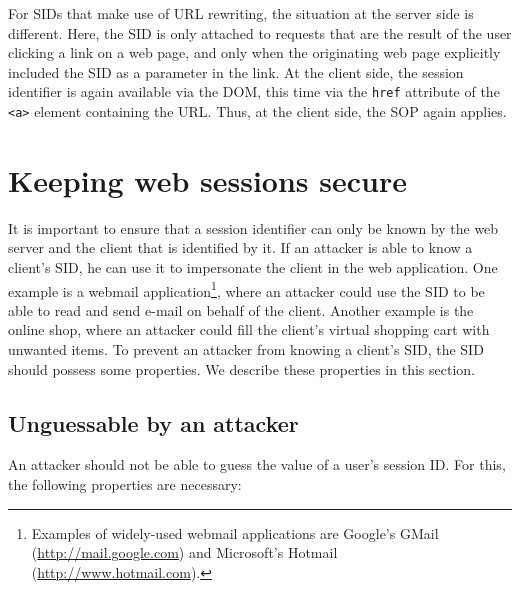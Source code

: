 For SIDs that make use of URL rewriting, the situation at the server side is different. Here, the SID is only attached to requests that are the result of the user clicking a link on a web page, and only when the originating web page explicitly included the SID as a parameter in the link. At the client side, the session identifier is again available via the DOM, this time via the \texttt{href} attribute of the \texttt{<a>} element containing the URL. Thus, at the client side, the SOP again applies.

\section{Keeping web sessions secure}\label{secure-sessions}

It is important to ensure that a session identifier can only be known by the web server and the client that is identified by it. If an attacker is able to know a client's SID, he can use it to impersonate the client in the web application. One example is a webmail application\footnote{Examples of widely-used webmail applications are Google's GMail (\url{http://mail.google.com}) and Microsoft's Hotmail (\url{http://www.hotmail.com}).}, where an attacker could use the SID to be able to read and send e-mail on behalf of the client. Another example is the online shop, where an attacker could fill the client's virtual shopping cart with unwanted items. To prevent an attacker from knowing a client's SID, the SID should possess some properties. We describe these properties in this section.

\subsection{Unguessable by an attacker}\label{unguessable}

An attacker should not be able to guess the value of a user's session ID. For this, the following properties are necessary:

